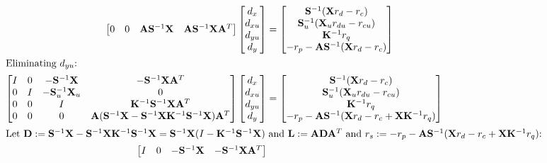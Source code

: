 \documentclass[10pt,a4paper]{article}
\begin{document}
\begin{align*}
\begin{bmatrix}
0 & 0 & \mathbf{A}\mathbf{S}^{-1}\mathbf{X} & \mathbf{A}\mathbf{S}^{-1}\mathbf{X}\mathbf{A}^T
\end{bmatrix}
\begin{bmatrix}d_x \\ d_{xu} \\ d_{yu} \\ d_y\end{bmatrix} &= 
\begin{bmatrix}
\mathbf{S}^{-1}(\mathbf{X}r_d - r_c) \\
\mathbf{S}_u^{-1}(\mathbf{X}_ur_{du} - r_{cu}) \\
\mathbf{K}^{-1}r_q \\
-r_p - \mathbf{A}\mathbf{S}^{-1}(\mathbf{X}r_d - r_c)
\end{bmatrix} \\
\intertext{Eliminating $d_{yu}$:}
\begin{bmatrix}
I & 0 & -\mathbf{S}^{-1}\mathbf{X} & -\mathbf{S}^{-1}\mathbf{X}\mathbf{A}^T \\
0 & I & -\mathbf{S}_u^{-1}\mathbf{X}_u & 0 \\
0 & 0 & I & \mathbf{K}^{-1}\mathbf{S}^{-1}\mathbf{X}\mathbf{A}^T \\
0 & 0 & 0 & \mathbf{A}(\mathbf{S}^{-1}\mathbf{X} - \mathbf{S}^{-1}\mathbf{X}\mathbf{K}^{-1}\mathbf{S}^{-1}\mathbf{X})\mathbf{A}^T
\end{bmatrix}
\begin{bmatrix}d_x \\ d_{xu} \\ d_{yu} \\ d_y\end{bmatrix} &= 
\begin{bmatrix}
\mathbf{S}^{-1}(\mathbf{X}r_d - r_c) \\
\mathbf{S}_u^{-1}(\mathbf{X}_ur_{du} - r_{cu}) \\
\mathbf{K}^{-1}r_q \\
-r_p - \mathbf{A}\mathbf{S}^{-1}(\mathbf{X}r_d - r_c + \mathbf{X}\mathbf{K}^{-1}r_q)
\end{bmatrix} \\
\intertext{Let $\mathbf{D} := \mathbf{S}^{-1}\mathbf{X} - \mathbf{S}^{-1}\mathbf{X}\mathbf{K}^{-1}\mathbf{S}^{-1}\mathbf{X} = \mathbf{S}^{-1}\mathbf{X}(I - \mathbf{K}^{-1}\mathbf{S}^{-1}\mathbf{X})$ and $\mathbf{L} := \mathbf{A}\mathbf{D}\mathbf{A}^T$ and $r_s := -r_p - \mathbf{A}\mathbf{S}^{-1}(\mathbf{X}r_d - r_c + \mathbf{X}\mathbf{K}^{-1}r_q)$:}
\begin{bmatrix}
I & 0 & -\mathbf{S}^{-1}\mathbf{X} & -\mathbf{S}^{-1}\mathbf{X}\mathbf{A}^T \\

\end{bmatrix}
\end{align*}
\end{document}
